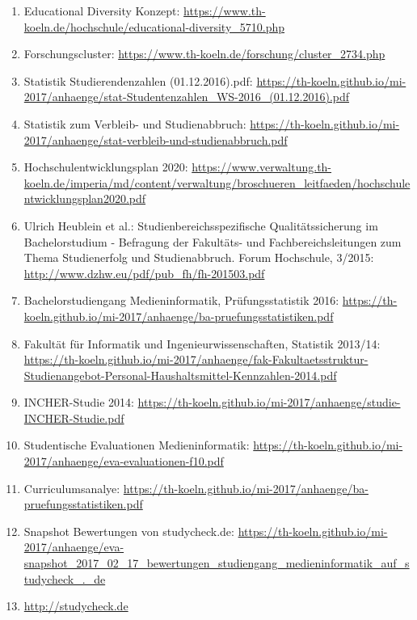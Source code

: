 \documentclass[BCOR12mm,DIV11,titlepage,a4paper,oneside,10pt]{scrbook}
\begin{document}
\begin{sloppypar}
\begin{flushleft}

\begin{enumerate}
\item{Educational Diversity Konzept: \url{https://www.th-koeln.de/hochschule/educational-diversity\_5710.php} } 
\item{Forschungscluster: \url{https://www.th-koeln.de/forschung/cluster\_2734.php} } 
\item{Statistik Studierendenzahlen (01.12.2016).pdf: \url{https://th-koeln.github.io/mi-2017/anhaenge/stat-Studentenzahlen\_WS-2016\_(01.12.2016).pdf} } 
\item{Statistik zum Verbleib- und Studienabbruch: \url{https://th-koeln.github.io/mi-2017/anhaenge/stat-verbleib-und-studienabbruch.pdf} } 
\item{Hochschulentwicklungsplan 2020: \url{https://www.verwaltung.th-koeln.de/imperia/md/content/verwaltung/broschueren\_leitfaeden/hochschulentwicklungsplan2020.pdf} } 
\item{Ulrich Heublein et al.: Studienbereichsspezifische Qualitätssicherung im Bachelorstudium - Befragung der Fakultäts- und Fachbereichsleitungen zum Thema Studienerfolg und Studienabbruch. Forum Hochschule, 3/2015: \url{http://www.dzhw.eu/pdf/pub\_fh/fh-201503.pdf} } 
\item{Bachelorstudiengang Medieninformatik, Prüfungsstatistik 2016: \url{https://th-koeln.github.io/mi-2017/anhaenge/ba-pruefungsstatistiken.pdf} } 
\item{Fakultät für Informatik und Ingenieurwissenschaften, Statistik 2013/14: \url{https://th-koeln.github.io/mi-2017/anhaenge/fak-Fakultaetsstruktur-Studienangebot-Personal-Haushaltsmittel-Kennzahlen-2014.pdf} } 
\item{INCHER-Studie 2014: \url{https://th-koeln.github.io/mi-2017/anhaenge/studie-INCHER-Studie.pdf} } 
\item{Studentische Evaluationen Medieninformatik: \url{https://th-koeln.github.io/mi-2017/anhaenge/eva-evaluationen-f10.pdf} } 
\item{Curriculumsanalye: \url{https://th-koeln.github.io/mi-2017/anhaenge/ba-pruefungsstatistiken.pdf} } 
\item{Snapshot Bewertungen von studycheck.de: \url{https://th-koeln.github.io/mi-2017/anhaenge/eva-snapshot\_2017\_02\_17\_bewertungen\_studiengang\_medieninformatik\_auf\_studycheck\_.\_de} } 
\item{\url{http://studycheck.de}} 

\end{enumerate}
\end{flushleft}
\end{sloppypar}
\end{document}
